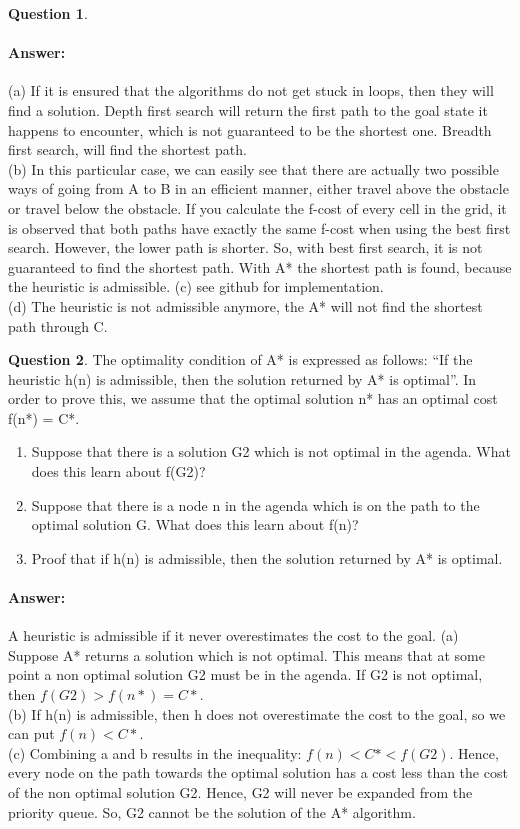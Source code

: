 \documentclass[11pt,a4paper]{article}
\theoremstyle{definition}%
\newtheorem{Q}{Question}[] %
\newcommand{\reponse}[1]{%
\ifthenelse {\boolean{corrige}} {\paragraph{Answer:} \color{darkblue}   #1\color{black}} {}
}
\begin{document}
\begin{Q}
\reponse{
    (a) If it is ensured that the algorithms do not get stuck in loops, then they will find a
solution. Depth first search will return the first path to the goal state it happens to
encounter, which is not guaranteed to be the shortest one. Breadth first search, will
find the shortest path.\\
(b) In this particular case, we can easily see that there are actually two possible ways of
going from A to B in an efficient manner, either travel above the obstacle or travel
below the obstacle. If you calculate the f-cost of every cell in the grid, it is observed
that both paths have exactly the same f-cost when using the best first search. However,
the lower path is shorter. So, with best first search, it is not guaranteed to find the
shortest path. With A* the shortest path is found, because the heuristic is admissible.
(c) see github for implementation.\\
(d) The heuristic is not admissible anymore, the A* will not find the shortest path through C.

}
\end{Q}


\begin{Q}
    The optimality condition of A* is expressed as follows: “If the heuristic h(n) is admissible,
then the solution returned by A* is optimal”. In order to prove this, we assume that the
optimal solution n* has an optimal cost f(n*) = C*.

\begin{enumerate}
    \item Suppose that there is a solution G2 which is not optimal in the agenda. What does
    this learn about f(G2)?
    \item Suppose that there is a node n in the agenda which is on the path to the optimal
    solution G. What does this learn about f(n)?
    \item Proof that if h(n) is admissible, then the solution returned by A* is optimal.
\end{enumerate}
\reponse{
    A heuristic is admissible if it never overestimates the cost to the goal.
(a) Suppose A* returns a solution which is not optimal. This means that at some point a
non optimal solution G2 must be in the agenda. If G2 is not optimal, then $f(G2) >
f(n*) = C*$.\\
(b) If h(n) is admissible, then h does not overestimate the cost to the goal, so we can put
$f(n) < C*$.\\
(c) Combining a and b results in the inequality: $f(n) < C* < f(G2)$. Hence, every node
on the path towards the optimal solution has a cost less than the cost of the non
optimal solution G2. Hence, G2 will never be expanded from the priority queue. So,
G2 cannot be the solution of the A* algorithm.
}
\end{Q}
\end{document}
